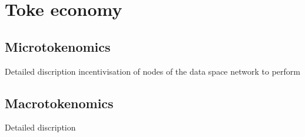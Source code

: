 \section{Toke economy}
\label{sec:token}

\subsection {Microtokenomics}
		
			Detailed discription incentivisation of nodes of the data space network to perform 

\subsection {Macrotokenomics}
			
			Detailed discription 